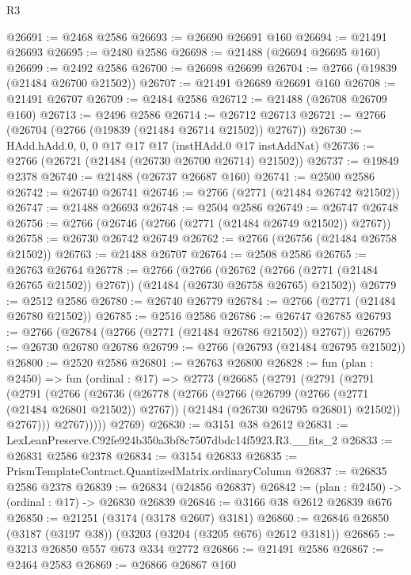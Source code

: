 \begin{lexlean}{R3}
\begin{coremodule}
@26691 := @2468 @2586
@26693 := @26690 @26691 @160
@26694 := @21491 @26693
@26695 := @2480 @2586
@26698 := @21488 (@26694 @26695 @160)
@26699 := @2492 @2586
@26700 := @26698 @26699
@26704 := @2766 (@19839 (@21484 @26700 @21502))
@26707 := @21491 @26689 @26691 @160
@26708 := @21491 @26707
@26709 := @2484 @2586
@26712 := @21488 (@26708 @26709 @160)
@26713 := @2496 @2586
@26714 := @26712 @26713
@26721 := @2766 (@26704 (@2766 (@19839 (@21484 @26714 @21502)) @2767))
@26730 := HAdd.hAdd.{0, 0, 0} @17 @17 @17 (instHAdd.{0} @17 instAddNat)
@26736 := @2766 (@26721 (@21484 (@26730 @26700 @26714) @21502))
@26737 := @19849 @2378
@26740 := @21488 (@26737 @26687 @160)
@26741 := @2500 @2586
@26742 := @26740 @26741
@26746 := @2766 (@2771 (@21484 @26742 @21502))
@26747 := @21488 @26693
@26748 := @2504 @2586
@26749 := @26747 @26748
@26756 := @2766 (@26746 (@2766 (@2771 (@21484 @26749 @21502)) @2767))
@26758 := @26730 @26742 @26749
@26762 := @2766 (@26756 (@21484 @26758 @21502))
@26763 := @21488 @26707
@26764 := @2508 @2586
@26765 := @26763 @26764
@26778 := @2766
    (@2766
      (@26762 (@2766 (@2771 (@21484 @26765 @21502)) @2767))
      (@21484 (@26730 @26758 @26765) @21502))
@26779 := @2512 @2586
@26780 := @26740 @26779
@26784 := @2766 (@2771 (@21484 @26780 @21502))
@26785 := @2516 @2586
@26786 := @26747 @26785
@26793 := @2766 (@26784 (@2766 (@2771 (@21484 @26786 @21502)) @2767))
@26795 := @26730 @26780 @26786
@26799 := @2766 (@26793 (@21484 @26795 @21502))
@26800 := @2520 @2586
@26801 := @26763 @26800
@26828 := fun (plan : @2450) =>
  fun (ordinal : @17) =>
  @2773
    (@26685
      (@2791
        (@2791
          (@2791
            (@2791
              (@2766
                (@26736
                  (@26778
                    (@2766
                      (@2766
                        (@26799 (@2766 (@2771 (@21484 @26801 @21502)) @2767))
                        (@21484 (@26730 @26795 @26801) @21502))
                      @2767)))
                @2767)))))
      @2769)
@26830 := @3151 @38 @2612
@26831 := LexLeanPreserve.C92fe924b350a3bf8c7507dbdc14f5923.R3.__fits_2
@26833 := @26831 @2586 @2378
@26834 := @3154 @26833
@26835 := PrismTemplateContract.QuantizedMatrix.ordinaryColumn
@26837 := @26835 @2586 @2378
@26839 := @26834 (@24856 @26837)
@26842 := (plan : @2450) -> (ordinal : @17) -> @26830 @26839
@26846 := @3166 @38 @2612 @26839 @676
@26850 := @21251 (@3174 (@3178 @2607) @3181)
@26860 := @26846 @26850 (@3187 (@3197 @38)) (@3203 (@3204 (@3205 @676) @2612 @3181))
@26865 := @3213 @26850 @557 @673 @334 @2772
@26866 := @21491 @2586
@26867 := @2464 @2583
@26869 := @26866 @26867 @160

\end{coremodule}
\end{lexlean}

